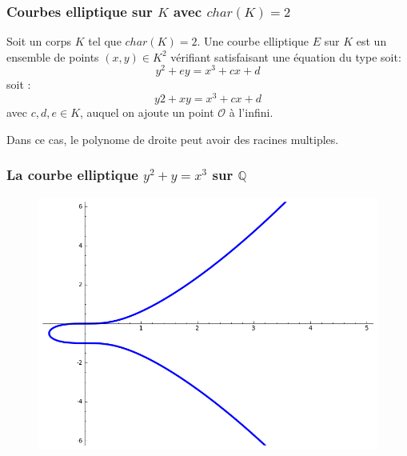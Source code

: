 \documentclass[9pt]{beamer}
\begin{document}
\begin{frame}
    \frametitle{Courbes elliptique sur $K$ avec $char(K) = 2$}
    \begin{df}
        Soit un corps $K$ tel que $char(K) = 2$. Une courbe elliptique $E$ sur $K$ est un
        ensemble de points $(x,y) \in K^2$ vérifiant satisfaisant une équation du type soit:
        \[
            y^2 + ey = x^3 + cx + d
        \]
        soit : 
        \[
            y2 + xy = x^3 + cx + d
        \]
        avec $c, d, e \in K$, auquel on ajoute un point $\mathcal{O}$ à l'infini.
    \end{df}

    \begin{rmq}
        Dans ce cas, le polynome de droite peut avoir des racines multiples.
    \end{rmq}
\end{frame}

\begin{frame}
    \frametitle{La courbe elliptique $y^2 + y= x^3$ sur $\mathbb{Q}$}
    \begin{figure}
        \includegraphics[scale=0.5]{ecc2.png}
    \end{figure}
\end{frame}
\end{document}
